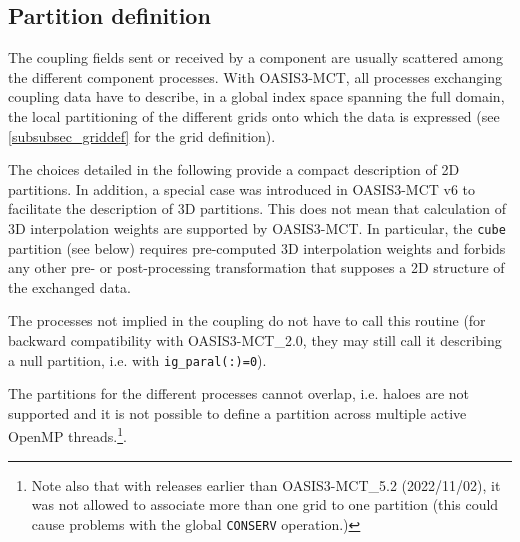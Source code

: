 \subsection{Partition definition}
\label{subsubsec_Partition}

The coupling fields sent or received by a component are usually
scattered among the different component processes. With OASIS3-MCT,
all processes exchanging coupling data have to describe, in a global index space spanning the full domain, the local
partitioning of the different grids onto which the data is expressed (see \ref{subsubsec_griddef} for the grid definition).

The choices detailed in the following provide a compact description of
2D partitions. In addition, a special case was introduced in
OASIS3-MCT v6 to facilitate the description of 3D partitions. This
does not mean that calculation of 3D interpolation weights are supported by OASIS3-MCT. In particular, the
{\tt cube} partition (see below) requires pre-computed 3D interpolation weights and
forbids any other pre- or post-processing transformation that supposes
a 2D structure of the exchanged data.

The processes not implied in the
coupling do not have to call this routine (for backward compatibility with OASIS3-MCT\_2.0,
they may still call it describing a null partition, i.e. with {\tt ig\_paral(:)=0}).

The partitions for the different processes cannot overlap, i.e. haloes are not supported and it is not possible to define a partition across multiple active OpenMP threads.\footnote{Note also that with releases earlier than OASIS3-MCT\_5.2 (2022/11/02), it was not allowed to associate more than
one grid to one partition (this could cause problems with the global {\tt CONSERV} operation.)}.

